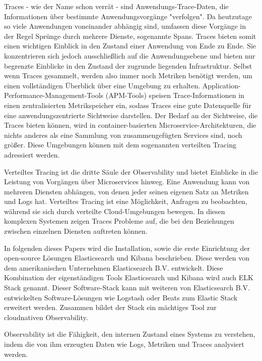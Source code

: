 Traces - wie der Name schon verrät - 
sind Anwendungs-Trace-Daten, die Informationen über bestimmte Anwendungsvorgänge
"verfolgen". Da heutzutage so viele Anwendungen voneinander abhängig sind, 
umfassen diese Vorgänge in der Regel Sprünge durch mehrere Dienste, sogenannte Spans.
Traces bieten somit einen wichtigen Einblick in den Zustand einer Anwendung 
von Ende zu Ende. Sie konzentrieren sich jedoch ausschließlich auf die Anwendungsebene
und bieten nur begrenzte Einblicke in den Zustand der zugrunde liegenden Infrastruktur.
Selbst wenn Traces gesammelt, werden also immer noch Metriken benötigt werden, 
um einen vollständigen Überblick über eine Umgebung zu erhalten. 
Application-Performance-Management-Tools (APM-Tools) speisen Trace-Informationen in einen
zentralisierten Metrikspeicher ein, sodass Traces eine gute Datenquelle für eine anwendungszentrierte Sichtweise darstellen.
Der Bedarf an der Sichtweise, die Traces bieten können, wird in container-basierten
Microservice-Architekturen, die nichts anderes als eine Sammlung von zusammengefügten
Services sind, noch größer. Diese Umgebungen können mit dem sogenannten
verteilten Tracing adressiert werden.

Verteiltes Tracing ist die dritte Säule der Observability und bietet Einblicke in die 
Leistung von Vorgängen über Microservices hinweg. Eine Anwendung kann von mehreren Diensten 
abhängen, von denen jeder seinen eigenen Satz an Metriken und Logs hat. 
Verteiltes Tracing ist eine Möglichkeit, Anfragen zu beobachten, während sie sich 
durch verteilte Cloud-Umgebungen bewegen. In diesen komplexen Systemen zeigen Traces 
Probleme auf, die bei den Beziehungen zwischen einzelnen Diensten auftreten können.

In folgenden dieses Papers wird die Installation, sowie die erste Einrichtung
der open-source Lösungen Elasticsearch und Kibana beschrieben.
Diese werden von dem amerikanischen Unternehmen Elasticsearch B.V.
entwickelt. Diese Kombination der eigenständigen Tools
Elasticsearch und Kibana wird auch ELK Stack genannt.  
Dieser Software-Stack kann mit weiteren von Elasticsearch B.V. entwickelten
Software-Lösungen wie Logstash oder Beats zum Elastic Stack erweitert werden.
Zusammen bildet der Stack ein mächtiges Tool zur cloudnativen
Observability.

Observability ist die Fähigkeit, den internen Zustand eines Systems zu verstehen, 
indem die von ihm erzeugten Daten wie Logs, Metriken und Traces analysiert werden.




